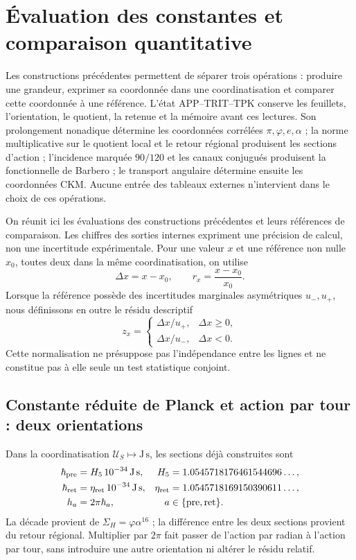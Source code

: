 \section{Évaluation des constantes et comparaison quantitative}
\label{sec:ii-contraste-cuantitativo}

Les constructions précédentes permettent de séparer trois opérations :
produire une grandeur, exprimer sa coordonnée dans une coordinatisation et comparer cette
coordonnée à une référence. L’état APP--TRIT--TPK conserve les feuillets,
l’orientation, le quotient, la retenue et la mémoire avant ces lectures. Son
prolongement nonadique détermine les coordonnées corrélées
\(\pi,\varphi,e,\alpha\) ; la norme multiplicative sur le quotient local et le retour régional
produisent les sections d’action ; l’incidence marquée \(90/120\) et
les canaux conjugués produisent la fonctionnelle de Barbero ; le transport
angulaire détermine ensuite les coordonnées CKM. Aucune entrée des tableaux
externes n’intervient dans le choix de ces opérations.

On réunit ici les évaluations des constructions précédentes et leurs
références de comparaison. Les chiffres des sorties internes expriment
une précision de calcul, non une incertitude expérimentale. Pour une valeur
\(x\) et une référence non nulle \(x_0\), toutes deux dans la même coordinatisation, on utilise
\[
 \Delta x=x-x_0,\qquad r_x=\frac{x-x_0}{x_0}.
\]
Lorsque la référence possède des incertitudes marginales asymétriques
\(u_-,u_+\), nous définissons en outre le résidu descriptif
\begin{equation}
 z_x=\begin{cases}
 \Delta x/u_+,&\Delta x\geq0,\\
 \Delta x/u_-,&\Delta x<0.
 \end{cases}
 \label{eq:ii-residuo-marginal}
\end{equation}
Cette normalisation ne présuppose pas l’indépendance entre les lignes et ne constitue pas
à elle seule un test statistique conjoint.

\subsection{Constante réduite de Planck et action par tour : deux orientations}

Dans la coordinatisation \(\mathcal U_S\mapsto\mathrm{J\,s}\), les sections déjà
construites sont
\begin{align}
 \hbar_{\rm pre}&=H_5\,10^{-34}\,\mathrm{J\,s},&
 H_5&=1.0545718176461544696\ldots,\\
 \hbar_{\rm ret}&=\eta_{\rm ret}\,10^{-34}\,\mathrm{J\,s},&
 \eta_{\rm ret}&=1.0545718169150390611\ldots,\\
 h_a&=2\pi\hbar_a,&a&\in\{\mathrm{pre},\mathrm{ret}\}.
 \label{eq:ii-cuatro-coordenadas-planck}
\end{align}
La décade provient de \(\Sigma_H=\varphi\alpha^{16}\) ; la différence entre
les deux sections provient du retour régional. Multiplier par \(2\pi\)
fait passer de l’action par radian à l’action par tour, sans introduire une autre
orientation ni altérer le résidu relatif.

